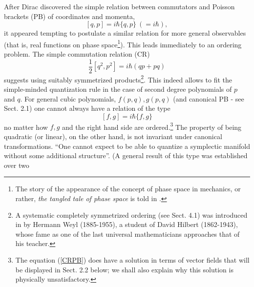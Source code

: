 \documentclass[12pt]{article}
\begin{document}
After Dirac discovered the simple relation between commutators and Poisson brackets
(PB) of coordinates and momenta,
\begin{equation}
\label{qp}
[q, p] = i\hbar \{q, p\}\ (= i\hbar),
\end{equation}
it appeared tempting to postulate a similar relation for more general observables (that is, real functions on 
phase space\footnote{The story of the appearance of the concept of phase space in mechanics, 
or rather, {\it the tangled tale of phase space} is told in \cite{N}.}). This leads immediately to an ordering
problem. The simple commutation relation (CR)
\begin{equation}
\label{quadr}
 \frac{1}{2} [q^2, p^2] = i\hbar (qp + pq)
\end{equation}
suggests using suitably symmetrized products\footnote{A systematic completely 
symmetrized ordering (see Sect. 4.1) was introduced in \cite{We} by Hermann Weyl (1885-1955), 
a student of David Hilbert (1862-1943), whose fame as one of the last universal 
mathematicians approaches that of his teacher.}. This indeed allows to fit the simple-minded 
quantization rule in the case of second degree polynomials of $p$ and $q$. For general cubic 
polynomials, $f(p, q), g(p,q)$ (and canonical PB - see Sect. 2.1) one cannot always have a 
relation of the type
\begin{equation}
\label{CRPB}
[f, g] = i \hbar \{f, g\}
\end{equation}
no matter how $f, g$ and the right hand side are ordered.\footnote{The equation
(\ref{CRPB}) does have a solution in terms of vector fields that will be
displayed in Sect. 2.2 below; we shall also explain why this solution is
physically unsatisfactory.}  The property of being quadratic (or linear), on the
 other hand, is not invariant under canonical transformations. ``One cannot
expect to be able to quantize a symplectic manifold without some additional
structure''\cite{GW}. (A general result of this type was established over two
\end{document}
